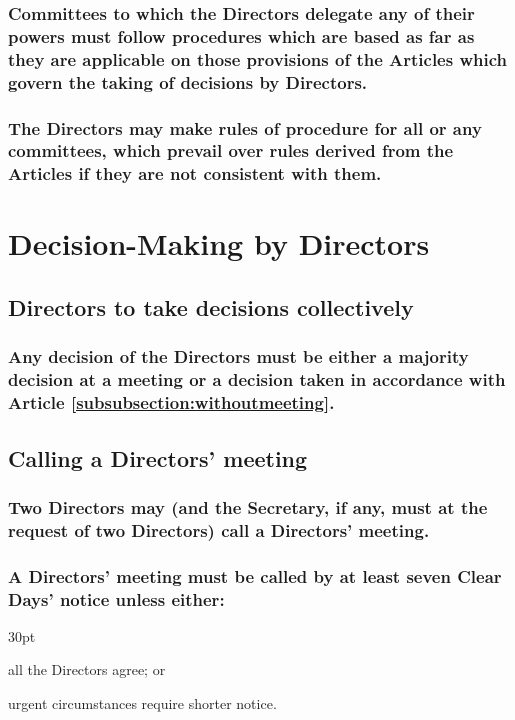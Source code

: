 \documentclass[12pt]{article}
\def\clauseindent{30pt}
\newenvironment{subindentpara}{\begin{adjustwidth}{\clauseindent}{}\begin{hanginglist}}{\end{hanginglist}\end{adjustwidth}}
\begin{document}
\subsubsection{Committees to which the Directors delegate any of their powers must follow procedures which are based as far as they are applicable on those provisions of the Articles which govern the taking of decisions by Directors.}
\subsubsection{The Directors may make rules of procedure for all or any committees, which prevail over rules derived from the Articles if they are not consistent with them.}

\section*{Decision-Making by Directors}

\subsection{Directors to take decisions collectively}
\subsubsection{Any decision of the Directors must be either a majority decision at a meeting or a decision taken in accordance with Article \ref{subsubsection:withoutmeeting}.}

\subsection{Calling a Directors’ meeting}
\subsubsection{Two Directors may (and the Secretary, if any, must at the request of two Directors) call a Directors’ meeting.}
\subsubsection{A Directors’ meeting must be called by at least seven Clear Days’ notice unless either:}
\begin{subindentpara}
  \item all the Directors agree; or
  \item urgent circumstances require shorter notice.
\end{subindentpara}
\end{document}

